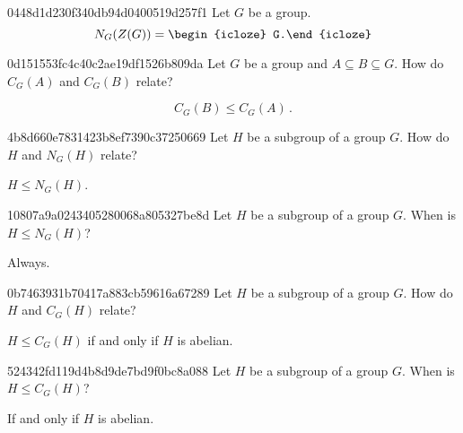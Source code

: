 \begin{note}{0448d1d230f340db94d0400519d257f1}
    Let \({ G }\) be a group.
    \[
        N_G (Z(G)) = \begin{icloze}{1}G.\end{icloze}
    \]
\end{note}

\begin{note}{0d151553fc4c40c2ae19df1526b809da}
    Let \({ G }\) be a group and \({ A \subseteq B \subseteq G }\).
    How do \({ C_G(A) }\) and \({ C_G(B) }\) relate?

    \begin{cloze}{1}
        \[
            C_G(B) \leq C_G(A)\,.
        \]
    \end{cloze}
\end{note}

\begin{note}{4b8d660e7831423b8ef7390c37250669}
    Let \({ H }\) be a subgroup of a group \({ G }\).
    How do \({ H }\) and \({ N_G(H) }\) relate?

    \begin{cloze}{1}
        \({ H \leq N_G(H) }\).
    \end{cloze}
\end{note}

\begin{note}{10807a9a0243405280068a805327be8d}
    Let \({ H }\) be a subgroup of a group \({ G }\).
    When is \({ H \leq N_G(H) }\)?

    \begin{cloze}{1}
        Always.
    \end{cloze}
\end{note}

\begin{note}{0b7463931b70417a883cb59616a67289}
    Let \({ H }\) be a subgroup of a group \({ G }\).
    How do \({ H }\) and \({ C_G(H) }\) relate?

    \begin{cloze}{1}
        \({ H \leq C_G(H) }\) if and only if \({ H }\) is abelian.
    \end{cloze}
\end{note}

\begin{note}{524342fd119d4b8d9de7bd9f0bc8a088}
    Let \({ H }\) be a subgroup of a group \({ G }\).
    When is \({ H \leq C_G(H) }\)?

    \begin{cloze}{1}
        If and only if \({ H }\) is abelian.
    \end{cloze}
\end{note}

